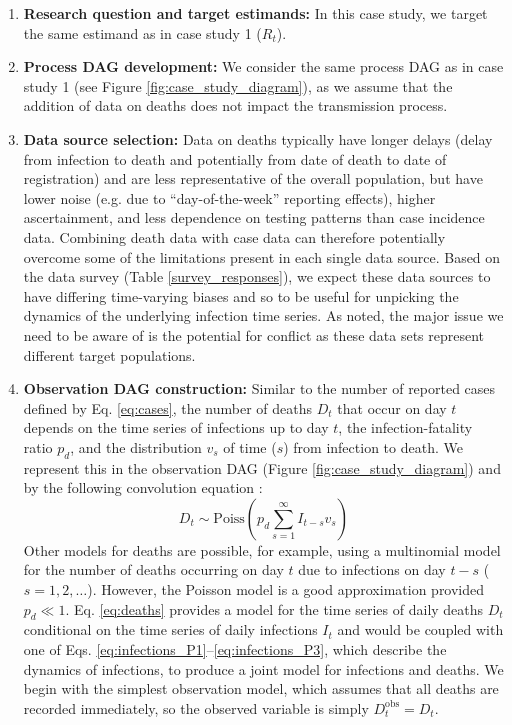 \documentclass{article}
\begin{document}
\begin{enumerate}
   \item \textbf{Research question and target estimands:}  In this case study, we target the same estimand as in case study 1 ($R_t$). 
   
    \item \textbf{Process DAG development:} We consider the same process \ac{DAG} as in case study 1 (see Figure \ref{fig:case_study_diagram}), as we assume that the addition of data on deaths does not impact the transmission process.
        
    \item \textbf{Data source selection:} Data on deaths typically have longer delays (delay from infection to death and potentially from date of death to date of registration) and are less representative of the overall population, but have lower noise (e.g. due to ``day-of-the-week'' reporting effects), higher ascertainment, and less dependence on testing patterns than case incidence data. Combining death data with case data can therefore potentially overcome some of the limitations present in each single data source. Based on the data survey (Table \ref{survey_responses}), we expect these data sources to have differing time-varying biases and so to be useful for unpicking the dynamics of the underlying infection time series. As noted, the major issue we need to be aware of is the potential for conflict as these data sets represent different target populations.
    
    \item \textbf{Observation DAG construction:} Similar to the number of reported cases defined by Eq. \eqref{eq:cases}, the number of deaths $D_t$ that occur on day $t$ depends on the time series of infections up to day $t$, the infection-fatality ratio $p_d$, and the distribution $v_s$ of time ($s$) from infection to death. We represent this in the observation \ac{DAG} (Figure \ref{fig:case_study_diagram}) and by the following convolution equation \citep{bhatt2023semi}:
    \begin{equation} \label{eq:deaths}
        D_t \sim \mathrm{Poiss}\left(p_d \sum_{s=1}^\infty I_{t-s}v_s \right)
    \end{equation}
    Other models for deaths are possible, for example, using a multinomial model for the number of deaths occurring on day $t$ due to infections on day $t-s$ ($s=1,2,\ldots$). However, the Poisson model is a good approximation provided $p_d\ll 1$. 
    Eq. \eqref{eq:deaths} provides a model for the time series of daily deaths $D_t$ conditional on the time series of daily infections $I_t$ and would be coupled with one of Eqs. \eqref{eq:infections_P1}--\eqref{eq:infections_P3}, which describe the dynamics of infections, to produce a joint model for infections and deaths. We begin with the simplest observation model, which assumes that all deaths are recorded immediately, so the observed variable is simply $D^\mathrm{obs}_t=D_t$.
    



\end{enumerate}
\end{document}
